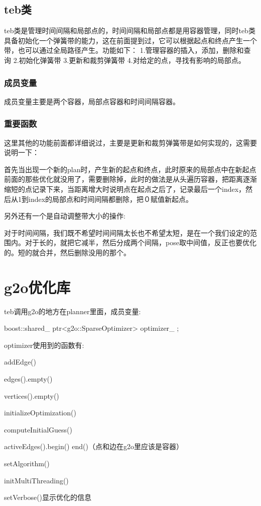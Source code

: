 \documentclass[10pt,a4paper]{article}
\theoremstyle{mythm}
\numberwithin{equation}{section}
\begin{document}
\subsection{teb类}
teb类是管理时间间隔和局部点的，时间间隔和局部点都是用容器管理，同时teb类具备初始化一个弹簧带的能力，这在前面提到过，它可以根据起点和终点产生一个带，也可以通过全局路径产生。功能如下：
1.管理容器的插入，添加，删除和查询
2.初始化弹簧带
3.更新和裁剪弹簧带
4.对给定的点，寻找有影响的局部点。
\subsubsection{成员变量}
成员变量主要是两个容器，局部点容器和时间间隔容器。
\subsubsection{重要函数}
这里其他的功能前面都详细说过，主要是更新和裁剪弹簧带是如何实现的，这需要说明一下：

首先当出现一个新的plan时，产生新的起点和终点，此时原来的局部点中在新起点前面的那些优化就没用了，需要删除掉，此时的做法是从头遍历容器，把距离逐渐缩短的点记录下来，当距离增大时说明点在起点之后了，记录最后一个index，然后从1到index的局部点和时间间隔都删除，把０赋值新起点。

另外还有一个是自动调整带大小的操作:

对于时间间隔，我们既不希望时间间隔太长也不希望太短，是在一个我们设定的范围内。对于长的，就把它减半，然后分成两个间隔，pose取中间值，反正也要优化的。短的就合并，然后删除没用的那个。

\section{g2o优化库}
teb调用g2o的地方在planner里面，成员变量:

boost::shared\_ ptr<g2o::SparseOptimizer> optimizer\_ ;

optimizer使用到的函数有:

addEdge()

edges().empty() 

vertices().empty()

initializeOptimization()

computeInitialGuess()

activeEdges().begin() end()（点和边在g2o里应该是容器）

setAlgorithm()

initMultiThreading()

setVerbose()显示优化的信息
\end{document}
